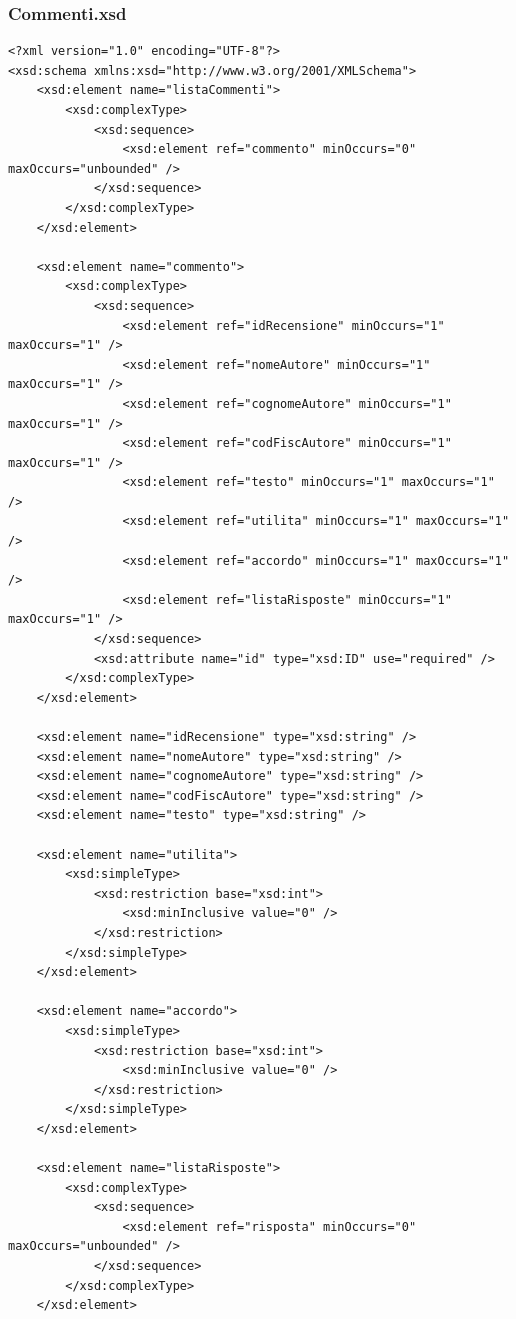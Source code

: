 \documentclass [a4paper, 12pt]{book}
\begin{document}
\subsubsection{Commenti.xsd}
\begin{lstlisting}[style=XML]
<?xml version="1.0" encoding="UTF-8"?>
<xsd:schema xmlns:xsd="http://www.w3.org/2001/XMLSchema">
    <xsd:element name="listaCommenti">
        <xsd:complexType>
            <xsd:sequence>
                <xsd:element ref="commento" minOccurs="0" maxOccurs="unbounded" />
            </xsd:sequence>
        </xsd:complexType>
    </xsd:element>

    <xsd:element name="commento">
        <xsd:complexType>
            <xsd:sequence>
                <xsd:element ref="idRecensione" minOccurs="1" maxOccurs="1" />
                <xsd:element ref="nomeAutore" minOccurs="1" maxOccurs="1" />
                <xsd:element ref="cognomeAutore" minOccurs="1" maxOccurs="1" />
                <xsd:element ref="codFiscAutore" minOccurs="1" maxOccurs="1" />
                <xsd:element ref="testo" minOccurs="1" maxOccurs="1" />
                <xsd:element ref="utilita" minOccurs="1" maxOccurs="1" />
                <xsd:element ref="accordo" minOccurs="1" maxOccurs="1" />
                <xsd:element ref="listaRisposte" minOccurs="1" maxOccurs="1" />
            </xsd:sequence>
            <xsd:attribute name="id" type="xsd:ID" use="required" />
        </xsd:complexType>
    </xsd:element>

    <xsd:element name="idRecensione" type="xsd:string" />
    <xsd:element name="nomeAutore" type="xsd:string" />
    <xsd:element name="cognomeAutore" type="xsd:string" />
    <xsd:element name="codFiscAutore" type="xsd:string" />
    <xsd:element name="testo" type="xsd:string" />
    
    <xsd:element name="utilita">
        <xsd:simpleType>
            <xsd:restriction base="xsd:int">
                <xsd:minInclusive value="0" />
            </xsd:restriction>
        </xsd:simpleType>
    </xsd:element>

    <xsd:element name="accordo">
        <xsd:simpleType>
            <xsd:restriction base="xsd:int">
                <xsd:minInclusive value="0" />
            </xsd:restriction>
        </xsd:simpleType>
    </xsd:element>

    <xsd:element name="listaRisposte">
        <xsd:complexType>
            <xsd:sequence>
                <xsd:element ref="risposta" minOccurs="0" maxOccurs="unbounded" />
            </xsd:sequence>
        </xsd:complexType>
    </xsd:element>


\end{lstlisting}
\end{document}
